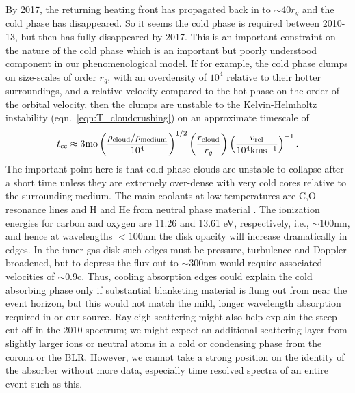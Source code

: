 \documentclass[a4paper,fleqn,usenatbib]{mnras}
\begin{document}
By 2017, the returning heating front has propagated back in to
$\sim$40$r_{g}$ and the cold phase has disappeared. So it seems the
cold phase is required between 2010-13, but then has fully disappeared
by 2017. This is an important constraint on the nature of the cold
phase which is an important but poorly understood component in our
phenomenological model. If for example, the cold phase clumps on
size-scales of order $r_g$, with an overdensity of $10^{4}$ relative
to their hotter surroundings, and a relative velocity compared to the
hot phase on the order of the orbital velocity, then the clumps are
unstable to the Kelvin-Helmholtz instability
(eqn.~\ref{eqn:T_cloudcrushing}) on an approximate timescale of
\begin{equation}
t_{{\rm cc}} \approx 3{\rm mo} 
               \left( \frac{\rho_{\rm{cloud}}/\rho_{\rm{medium}}}{10^{4}}   \right)^{1/2}
               \left( \frac{r_{\rm cloud}}{r_{g}}\right) 
              \left( \frac{v_{\rm rel}}{10^{4}\rm{km s^{-1}}} \right)^{-1}.
\end{equation}
The important point here is that cold phase clouds are unstable to
collapse after a short time unless they are extremely over-dense with
very cold cores relative to the surrounding medium. The main coolants
at low temperatures are C,O resonance lines and H and He from neutral
phase material \citep[see e.g., Fig. 18 in
][]{Sutherland_Dopita1993}. The ionization energies for carbon and
oxygen are 11.26 and 13.61 eV, respectively, i.e., $\sim 100$nm, and
hence at wavelengths $<100$nm the disk opacity will increase
dramatically in edges. In the inner gas disk such edges must be
pressure, turbulence and Doppler broadened, but to depress the flux
out to $\sim 300$nm would require associated velocities of $\sim
0.9$c. Thus, cooling absorption edges could explain the cold absorbing
phase only if substantial blanketing material is flung out from near
the event horizon, but this would not match the mild, longer
wavelength absorption required in \citep{Guo2016} or our
source. Rayleigh scattering might also help explain the steep cut-off
in the 2010 spectrum; we might expect an additional scattering layer
from slightly larger ions or neutral atoms in a cold or condensing
phase from the corona or the BLR. However, we cannot take a strong
position on the identity of the absorber without more data, especially
time resolved spectra of an entire event such as this.




\end{document}
